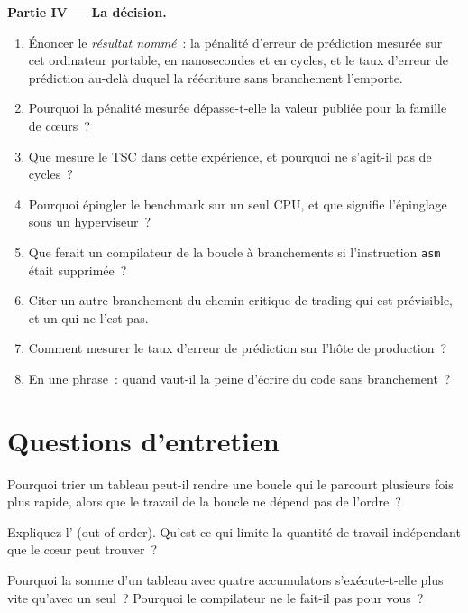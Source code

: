 \begin{problem}
\medskip\noindent\textbf{Partie IV --- La décision.}
\begin{enumerate}[resume]
\item Énoncer le \emph{résultat nommé}~: la pénalité d'erreur de prédiction mesurée sur cet ordinateur portable, en nanosecondes et en cycles, et le
taux d'erreur de prédiction au-delà duquel la réécriture sans branchement l'emporte.
\item Pourquoi la pénalité mesurée dépasse-t-elle la valeur publiée pour la famille de cœurs~?
\item Que mesure le TSC dans cette expérience, et pourquoi ne s'agit-il pas de cycles~?
\item Pourquoi épingler le benchmark sur un seul CPU, et que signifie l'épinglage sous un hyperviseur~?
\item Que ferait un compilateur de la boucle à branchements si l'instruction \texttt{asm} était supprimée~?
\item Citer un autre branchement du chemin critique de trading qui est prévisible, et un qui ne l'est pas.
\item Comment mesurer le taux d'erreur de prédiction sur l'hôte de production~?
\item En une phrase~: quand vaut-il la peine d'écrire du code sans branchement~?
\end{enumerate}
\end{problem}

\section{Questions d'entretien}

\begin{interviewq}\label{iq:ll:cpu-microarchitecture:1}
Pourquoi trier un tableau peut-il rendre une boucle qui le parcourt plusieurs fois plus rapide, alors que le travail de la boucle ne dépend pas de l'ordre~?
\end{interviewq}

\begin{interviewq}\label{iq:ll:cpu-microarchitecture:2}
Expliquez l' (out-of-order). Qu'est-ce qui limite la quantité de travail indépendant que le cœur peut trouver~?
\end{interviewq}

\begin{interviewq}\label{iq:ll:cpu-microarchitecture:3}
Pourquoi la somme d'un tableau avec quatre accumulators s'exécute-t-elle plus vite qu'avec un seul~? Pourquoi le compilateur ne le fait-il pas pour vous~?
\end{interviewq}

